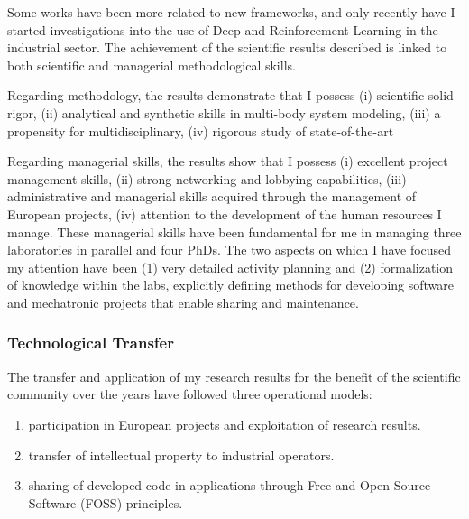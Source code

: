 Some works have been more related to new frameworks, and only recently
have I started investigations into the use of Deep and Reinforcement
Learning in the industrial sector. The achievement of the scientific
results described is linked to both scientific and managerial
methodological skills.

Regarding methodology, the results demonstrate that I possess (i)
scientific solid rigor, (ii) analytical and synthetic skills in
multi-body system modeling, (iii) a propensity for multidisciplinary,
(iv) rigorous study of state-of-the-art

Regarding managerial skills, the results show that I possess (i)
excellent project management skills, (ii) strong networking and lobbying
capabilities, (iii) administrative and managerial skills acquired
through the management of European projects, (iv) attention to the
development of the human resources I manage. These managerial skills
have been fundamental for me in managing three laboratories in parallel
and four PhDs. The two aspects on which I have focused my attention have
been (1) very detailed activity planning and (2) formalization of
knowledge within the labs, explicitly defining methods for developing
software and mechatronic projects that enable sharing and maintenance.

\subsubsection{Technological Transfer}\label{technological-transfer}

The transfer and application of my research results for the benefit of
the scientific community over the years have followed three operational
models:

\begin{enumerate}
\def\labelenumi{(\Alph{enumi})}
\item
  participation in European projects and exploitation of research
  results.
\item
  transfer of intellectual property to industrial operators.
\item
  sharing of developed code in applications through Free and Open-Source
  Software (FOSS) principles.
\end{enumerate}

